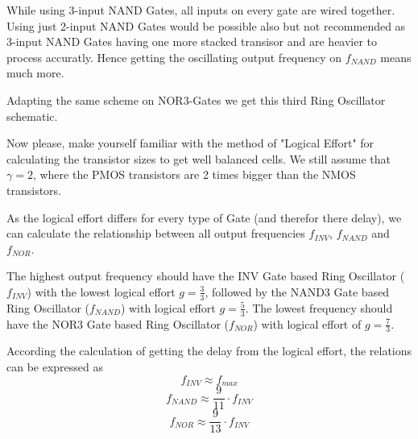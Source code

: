 

While using 3-input NAND Gates, all inputs on every gate are wired together. Using just 2-input NAND Gates would be possible also but not recommended as 3-input NAND Gates having one more stacked transisor and are heavier to process accuratly. Hence getting the oscillating output frequency on $f_{NAND}$ means much more.

Adapting the same scheme on NOR3-Gates we get this third Ring Oscillator schematic.



Now please, make yourself familiar with the method of "Logical Effort" for calculating the transistor sizes to get well balanced cells. We still assume that $\gamma = 2$, where the PMOS transistors are 2 times bigger than the NMOS transistors.

As the logical effort differs for every type of Gate (and therefor there delay), we can calculate the relationship between all output frequencies $f_{INV}$, $f_{NAND}$ and $f_{NOR}$.

The highest output frequency should have the INV Gate based Ring Oscillator ($f_{INV}$) with the lowest logical effort $g = \frac{3}{3}$, followed by the NAND3 Gate based Ring Oscillator ($f_{NAND}$) with logical effort $g = \frac{5}{3}$. The lowest frequency should have the NOR3 Gate based Ring Oscillator ($f_{NOR}$) with logical effort of $g = \frac{7}{3}$.

According the calculation of getting the delay from the logical effort, the relations can be expressed as
%
\begin{equation}
    f_{INV} \approx f_{max}
\end{equation}
%
\begin{equation}
    f_{NAND} \approx \frac{9}{11} \cdot f_{INV}
\end{equation}
%
\begin{equation}
    f_{NOR} \approx \frac{9}{13} \cdot f_{INV}
\end{equation}


